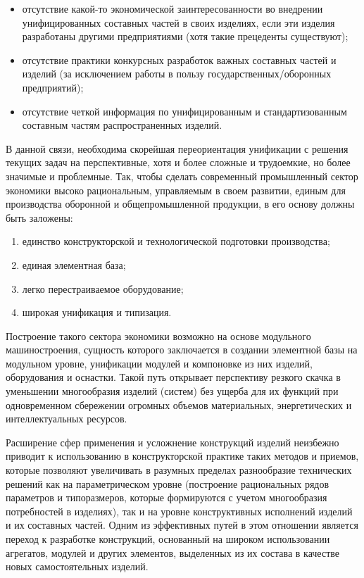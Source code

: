\begin{itemize}
	\item отсутствие какой-то экономической заинтересованности во внедрении унифицированных составных частей в своих изделиях, если эти изделия разработаны другими предприятиями (хотя такие прецеденты существуют);
	\item отсутствие практики конкурсных разработок важных составных частей и изделий (за исключением работы в пользу государственных/оборонных предприятий);
	\item отсутствие четкой информация по унифицированным и стандартизованным составным частям распространенных изделий.
\end{itemize}


В данной связи, необходима скорейшая переориентация унификации с решения текущих задач на перспективные, хотя и более сложные и трудоемкие, но более значимые и проблемные. Так, чтобы сделать современный промышленный сектор экономики высоко рациональным, управляемым в своем развитии, единым для производства оборонной и общепромышленной продукции, в его основу должны быть заложены:

\begin{enumerate}
	\item единство конструкторской и технологической подготовки производства;
	\item единая элементная база;
	\item легко перестраиваемое оборудование;
	\item широкая унификация и типизация.
\end{enumerate}
 

Построение такого сектора экономики возможно на основе модульного машиностроения, сущность которого заключается в создании элементной базы на модульном уровне, унификации модулей и компоновке из них изделий, оборудования и оснастки. Такой путь открывает перспективу резкого скачка в уменьшении многообразия изделий (систем) без ущерба для их функций при одновременном сбережении огромных объемов материальных, энергетических и интеллектуальных ресурсов.

Расширение сфер применения и усложнение конструкций изделий неизбежно приводит к использованию в конструкторской практике таких методов и приемов, которые позволяют увеличивать в разумных пределах разнообразие технических решений как на параметрическом уровне (построение рациональных рядов параметров и типоразмеров, которые формируются с учетом многообразия потребностей в изделиях), так и на уровне конструктивных исполнений изделий и их составных частей. Одним из эффективных путей в этом отношении является переход к разработке конструкций, основанный на широком использовании агрегатов, модулей и других элементов, выделенных из их состава в качестве новых самостоятельных изделий.

